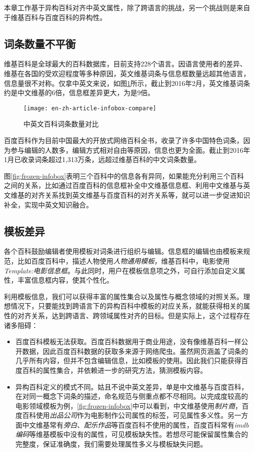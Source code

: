 本章工作基于异构百科对齐中英文属性，除了跨语言的挑战，另一个挑战则是来自于维基百科与百度百科的异构性。

\subsection{词条数量不平衡}

维基百科是全球最大的百科数据库，目前支持228个语言。因语言使用者的差异、维基在各国的受欢迎程度等多种原因，英文维基词条与信息框数量远超其他语言，信息量很不对称。仅拿中英文来说，如图\ref{fig:en-zh-article-infobox-compare}所示，截止到2016年2月，英文维基词条约是中文维基的6倍，信息框差异更大，为是9倍。

\begin{figure}[H]
  \centering
  \texttt{[image: en-zh-article-infobox-compare]}
  \caption{中英文百科词条数量对比}
  \label{fig:en-zh-article-infobox-compare}
\end{figure}

百度百科作为目前中国最大的开放式网络百科全书，收录了许多中国特色词条，因为参与编辑的人数多，编辑方式相对自由等原因，信息也更为全面。截止到2016年1月已收录词条超过1,313万条，远超过维基百科的中文词条数量。

图\ref{fig:frozen-infobox}表明三个百科中的信息各有异同，如果能充分利用三个百科之间的关系，比如通过百度百科的信息框补全中文维基信息框、利用中文维基与英文维基的对齐关系找到英文维基与百度百科的对齐关系等，就可以进一步促进知识补全，实现中英文知识融合。

\subsection{模板差异}

各个百科鼓励编辑者使用模板对词条进行组织与编辑。信息框的编辑也由模板来规范，比如百度百科中，描述人物使用\textit{人物通用模板}，维基百科中，电影使用\textit{Template:电影信息框}。与此同时，用户在模板信息项之外，可自行添加自定义属性，丰富信息框内容，使其个性化。

利用模板信息，我们可以获得丰富的属性集合以及属性与概念领域的对照关系。理想情况下，只要能找到跨语言下的异构百科中模板的对应关系，就能获得相关的属性的对齐关系，达到跨语言、跨领域属性对齐的目标。但是实际上，这个过程存在诸多阻碍：
\begin{itemize}
\item 百度百科模板无法获取。百度百科数据用于商业用途，没有像维基百科一样公开数据，因此百度百科数据的获取多来源于网络爬虫。虽然网页涵盖了词条的几乎所有内容，但并不包含编辑信息，比如模板的使用。因此我们只能获得百度百科的属性集合，并依赖进一步的研究方法，猜测模板内容。
\item 异构百科定义的模式不同。姑且不说中英文差异，单是中文维基与百度百科，在对同一概念下词条的描述，命名规范与侧重点都不尽相同。以完成度较高的电影领域模板为例，\ref{fig:frozen-infobox}中可以看到，中文维基使用\textit{制片商}，百度百科使用\textit{出品公司}作为电影制作公司属性的标签，可见{\heiti 属性多义性}。另一方面中文维基常有\textit{旁白}、\textit{配乐作品}等百度百科不使用的属性，百度百科常有\textit{imdb编码}等维基模板中没有的属性，可见{\heiti 模板缺失性}。若想尽可能保留属性集合的完整度，保证准确度，我们需要处理属性多义与模板缺失问题。
\end{itemize}

